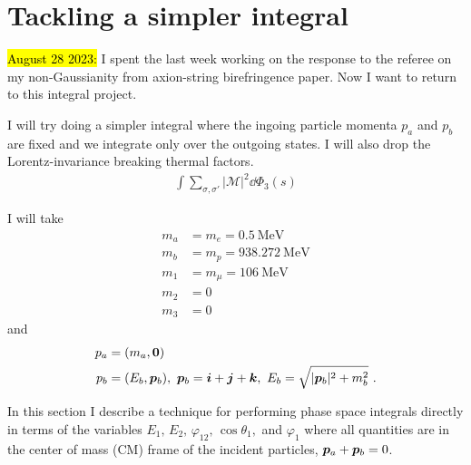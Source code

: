 \section{Tackling a simpler integral}
\label{sec:a-simpler-integral}
\hl{August 28 2023:} I spent the last week working on the response to the referee on my non-Gaussianity from axion-string birefringence paper. 
Now I want to return to this integral project.

I will try doing a simpler integral where the ingoing particle momenta $p_a$ and $p_b$ are fixed and we integrate only over the outgoing states. 
I will also drop the Lorentz-invariance breaking thermal factors. 
\begin{align}
    \int \sum_{\sigma, \sigma'} | \mathcal{M} |^2 \dd \Phi_3(s)
\end{align}

I will take 
\begin{align}
    m_a &= m_e = 0.5 \ \mathrm{MeV} \\
    m_b &= m_p = 938.272 \ \mathrm{MeV} \\
    m_1 &= m_\mu = 106 \ \mathrm{MeV} \\
    m_2 &= 0 \\
    m_3 &= 0
\end{align}
and 
\begin{align}
    p_a &= (m_a, \bm{0}) \\
    p_b &= (E_b, \bm{p}_b), \ \bm{p}_b = \bm{i} + \bm{j} + \bm{k}, \ E_b = \sqrt{|\pvec[b]|^2 + m_b^2}\ . 
\end{align}

\label{subsec:simple-integral-CM-energies}

In this section I describe a technique for performing phase space integrals directly in terms of the variables $E_1,\, E_2,\, \varphi_{12},\, \cos\theta_{1},$ and $\varphi_{1}$ where all quantities are in the center of mass (CM) frame of the incident particles, $\pvec[a] + \pvec[b] = 0$. 

